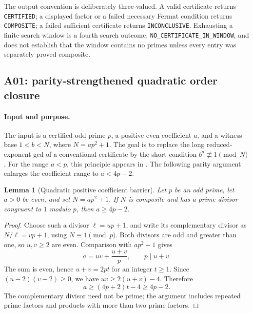 \documentclass[11pt,a4paper]{article}
\newtheorem{lemma}[theorem]{Lemma}
\theoremstyle{definition}\newtheorem{definition}[theorem]{Definition}
\theoremstyle{remark}\newtheorem{remark}[theorem]{Remark}
\begin{document}
The output convention is deliberately three-valued. A valid certificate
returns \texttt{CERTIFIED}; a displayed factor or a failed necessary Fermat
condition returns \texttt{COMPOSITE}; a failed sufficient certificate returns
\texttt{INCONCLUSIVE}. Exhausting a finite search window is a fourth search
outcome, \texttt{NO\_CERTIFICATE\_IN\_WINDOW}, and does not establish that the
window contains no primes unless every entry was separately proved composite.

\subsection{A01: parity-strengthened quadratic order closure}
\label{sec:a01}

\paragraph{Input and purpose.}
The input is a certified odd prime $p$, a positive even coefficient $a$, and
a witness base $1<b<N$, where $N=ap^2+1$. The goal is to replace the long
reduced-exponent gcd of a conventional certificate by the short condition
$b^a\not\equiv1\pmod N$. For the range $a<p$, this principle appears in
\cite[Theorem 4.4]{philemon2021}. The following parity argument enlarges the
coefficient range to $a<4p-2$.

\begin{lemma}[Quadratic positive coefficient barrier]\label{lem:a01-barrier}
Let $p$ be an odd prime, let $a>0$ be even, and set $N=ap^2+1$.
If $N$ is composite and has a prime divisor congruent to $1$ modulo $p$,
then $a\ge4p-2$.
\end{lemma}
\begin{proof}
Choose such a divisor $\ell=up+1$, and write its complementary divisor as
$N/\ell=vp+1$, using $N\equiv1\pmod p$. Both divisors are odd and greater
than one, so $u,v\ge2$ are even. Comparison with $ap^2+1$ gives
\[
 a=uv+\frac{u+v}{p},\qquad p\mid u+v.
\]
The sum is even, hence $u+v=2pt$ for an integer $t\ge1$. Since
$(u-2)(v-2)\ge0$, we have $uv\ge2(u+v)-4$. Therefore
\[
 a\ge(4p+2)t-4\ge4p-2.
\]
The complementary divisor need not be prime; the argument includes repeated
prime factors and products with more than two prime factors.
\end{proof}
\end{document}
